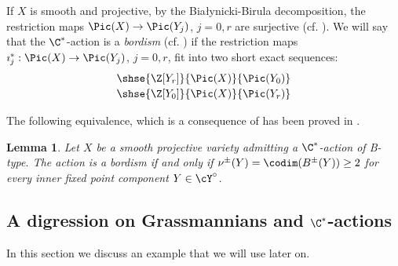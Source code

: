 \documentclass[reqno]{amsproc}
\newtheorem{lemma}[theorem]{Lemma}
\theoremstyle{definition}
\begin{document}
If $X$ is smooth and projective, by the Bia{\l}ynicki-Birula decomposition, the restriction maps $\Pic(X)\to \Pic(Y_j)$, $j=0,r$ are surjective (cf. \cite[Theorem~3]{CS79}). We will say that the $\C^*$-action is a {\em bordism} (cf. \cite[Definition~3.8]{WORS1}) if the restriction maps $\imath_j^*:\Pic(X)\to \Pic(Y_j)$, $j=0,r$, fit into two short exact sequences:
$$
\begin{array}{c}
\shse{\Z[Y_r]}{\Pic(X)}{\Pic(Y_0)}
\\[2pt]
\shse{\Z[Y_0]}{\Pic(X)}{\Pic(Y_r)}
\end{array}
$$

The following equivalence, which is a consequence of \cite[Theorem~3]{CS79} has been proved in \cite[Corollary~3.7]{WORS1}.
\begin{lemma}\label{lem:bordism} Let $X$ be a smooth projective variety admitting a $\C^*$-action of B-type. The action is a bordism if and only if $\nu^\pm(Y)=\codim(B^\pm(Y))\geq 2$ for every inner fixed point component $Y\in\cY^\circ$. 
\end{lemma}


\subsection{A digression on Grassmannians and $\C^*$-actions}\label{ssec:grass}
 
In this section we discuss an example that we will use later on. 
\end{document}
